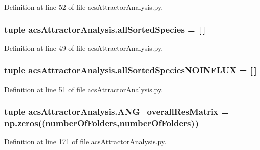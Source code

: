 Definition at line 52 of file acs\-Attractor\-Analysis.\-py.

\hypertarget{a00090_aafc595063b7c4b74f94c0931ff2370a5}{
\subsubsection[{all\-Sorted\-Species}]{\setlength{\rightskip}{0pt plus 5cm}tuple acs\-Attractor\-Analysis.\-all\-Sorted\-Species = \mbox{[}$\,$\mbox{]}}}\label{a00090_aafc595063b7c4b74f94c0931ff2370a5}


Definition at line 49 of file acs\-Attractor\-Analysis.\-py.

\hypertarget{a00090_a02a8db664a67956bc698b79f7c31a7bd}{
\subsubsection[{all\-Sorted\-Species\-N\-O\-I\-N\-F\-L\-U\-X}]{\setlength{\rightskip}{0pt plus 5cm}tuple acs\-Attractor\-Analysis.\-all\-Sorted\-Species\-N\-O\-I\-N\-F\-L\-U\-X = \mbox{[}$\,$\mbox{]}}}\label{a00090_a02a8db664a67956bc698b79f7c31a7bd}


Definition at line 51 of file acs\-Attractor\-Analysis.\-py.

\hypertarget{a00090_a43a783e7bdb1094aa477c438bd67259f}{
\subsubsection[{A\-N\-G\-\_\-overall\-Res\-Matrix}]{\setlength{\rightskip}{0pt plus 5cm}tuple acs\-Attractor\-Analysis.\-A\-N\-G\-\_\-overall\-Res\-Matrix = np.\-zeros(({\bf number\-Of\-Folders},{\bf number\-Of\-Folders}))}}\label{a00090_a43a783e7bdb1094aa477c438bd67259f}


Definition at line 171 of file acs\-Attractor\-Analysis.\-py.

